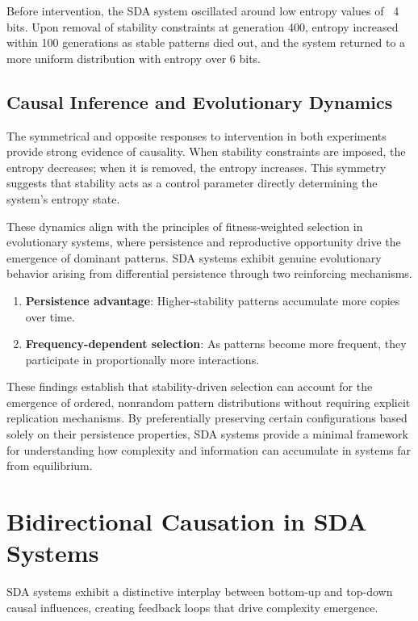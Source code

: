 \documentclass[preprint,12pt]{elsarticle}
\begin{document}
Before intervention, the SDA system oscillated around low entropy values of ~4 bits. Upon removal of stability constraints at generation 400, entropy increased within 100 generations as stable patterns died out, and the system returned to a more uniform distribution with entropy over 6 bits.

\subsection{Causal Inference and Evolutionary Dynamics}

The symmetrical and opposite responses to intervention in both experiments provide strong evidence of causality. When stability constraints are imposed, the entropy decreases; when it is removed, the entropy increases. This symmetry suggests that stability acts as a control parameter directly determining the system's entropy state.

These dynamics align with the principles of fitness-weighted selection in evolutionary systems, where persistence and reproductive opportunity drive the emergence of dominant patterns. SDA systems exhibit genuine evolutionary behavior arising from differential persistence through two reinforcing mechanisms.
\begin{enumerate}
    \item \textbf{Persistence advantage}: Higher-stability patterns accumulate more copies over time.
    \item \textbf{Frequency-dependent selection}: As patterns become more frequent, they participate in proportionally more interactions.
\end{enumerate}

These findings establish that stability-driven selection can account for the emergence of ordered, nonrandom pattern distributions without requiring explicit replication mechanisms. By preferentially preserving certain configurations based solely on their persistence properties, SDA systems provide a minimal framework for understanding how complexity and information can accumulate in systems far from equilibrium.


\section{Bidirectional Causation in SDA Systems}

SDA systems exhibit a distinctive interplay between bottom-up and top-down causal influences, creating feedback loops that drive complexity emergence.
\end{document}
